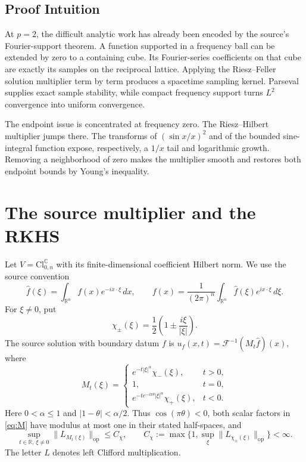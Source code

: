\documentclass[10pt]{article}
\newcommand{\R}{\mathbb R}
\newcommand{\F}{\mathcal F}
\newcommand{\Cl}{\mathrm{Cl}_{0,n}^{\mathbb C}}
\newcommand{\op}{\mathrm{op}}
\begin{document}
\subsection*{Proof Intuition}

At $p=2$, the difficult analytic work has already been encoded by the source's
Fourier-support theorem.  A function supported in a frequency ball can be
extended by zero to a containing cube.  Its Fourier-series coefficients on
that cube are exactly its samples on the reciprocal lattice.  Applying the
Riesz--Feller solution multiplier term by term produces a spacetime sampling
kernel.  Parseval supplies exact sample stability, while compact frequency
support turns $L^2$ convergence into uniform convergence.

The endpoint issue is concentrated at frequency zero.  The Riesz--Hilbert
multiplier jumps there.  The transforms of $(\sin x/x)^2$ and of the bounded
sine-integral function expose, respectively, a $1/x$ tail and logarithmic
growth.  Removing a neighborhood of zero makes the multiplier smooth and
restores both endpoint bounds by Young's inequality.

\section{The source multiplier and the RKHS}

Let $V=\Cl$ with its finite-dimensional coefficient Hilbert norm.  We use the
source convention
\[
 \widehat f(\xi)=\int_{\R^n}f(x)e^{-ix\cdot\xi}\,dx,
 \qquad
 f(x)=\frac1{(2\pi)^n}\int_{\R^n}\widehat f(\xi)e^{ix\cdot\xi}\,d\xi.
\]
For $\xi\ne0$, put
\[
 \chi_\pm(\xi)=\frac12\left(1\pm\frac{i\xi}{|\xi|}\right).
\]
The source solution with boundary datum $f$ is
$u_f(x,t)=\F^{-1}(M_t\widehat f)(x)$, where
\begin{equation}\label{eq:M}
 M_t(\xi)=
 \begin{cases}
 e^{-t|\xi|^\alpha}\chi_-(\xi),&t>0,\\
 1,&t=0,\\
 e^{-t e^{-i\pi\theta}|\xi|^\alpha}\chi_+(\xi),&t<0.
 \end{cases}
\end{equation}
Here $0<\alpha\leq1$ and $|1-\theta|<\alpha/2$.  Thus
$\cos(\pi\theta)<0$, both scalar factors in \eqref{eq:M} have modulus at
most one in their stated half-spaces, and
\begin{equation}\label{eq:Cchi}
 \sup_{t\in\R,\,\xi\ne0}\|L_{M_t(\xi)}\|_\op\leq C_\chi,
 \qquad
 C_\chi:=\max\{1,\sup_\xi\|L_{\chi_\pm(\xi)}\|_\op\}<\infty.
\end{equation}
The letter $L$ denotes left Clifford multiplication.
\end{document}
